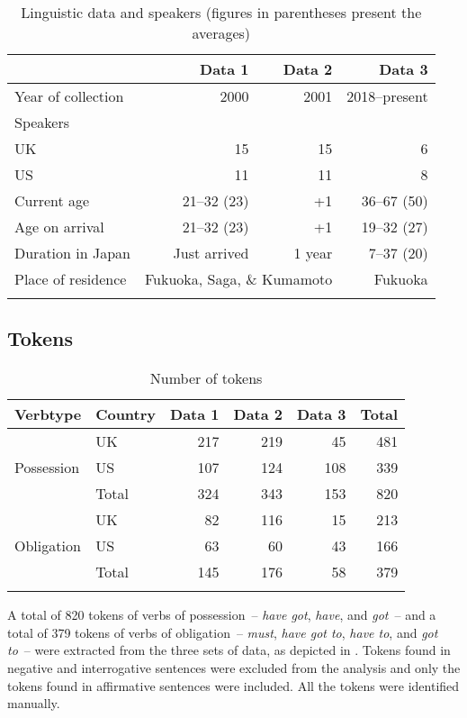 \documentclass[output=paper,colorlinks,citecolor=brown]{langscibook}
\begin{document}
\begin{table}
\begin{tabularx}{\textwidth}{Xrrr}
\lsptoprule
  & Data 1 & Data 2 & Data 3\\
\midrule
Year of collection & 2000 & 2001 & 2018--present\\
Speakers & & & \\
UK & 15 & 15 & 6\\
US & 11 & 11 & 8\\
Current age & 21--32 (23) & +1 & 36–67 (50)\\
Age on arrival & 21–32 (23) & +1 & 19–32 (27)\\
Duration in Japan & Just arrived & 1 year & 7–37 (20)\\
Place of residence & \multicolumn{2}{c}{Fukuoka, Saga, \& Kumamoto} & Fukuoka\\
\lspbottomrule
\end{tabularx}
\caption{\label{tab:hirano:1} Linguistic data and speakers (figures in parentheses present the averages)}
\end{table}



\subsection{Tokens} %
\label{sec:hirano:4.3}
\largerpage[2]

\begin{table}[b]
\begin{tabular}{llrrrr}
\lsptoprule
Verbtype & {Country} & {Data 1} & {Data 2} & {Data 3} & Total\\
\midrule
& UK &  217 &  219 &  45 &  481\\
Possession & US &  107 &  124 &  108 &  339\\
& Total &  324 &  343 &  153 &  820\\
\midrule
& UK &  82 &  116 &  15 &  213\\
Obligation & US &  63 &  60 &  43 &  166\\
 & Total &  145 &  176 &  58 &  379\\
\lspbottomrule
\end{tabular}
\caption{Number of tokens}
\label{tab:hirano:2}
\end{table}

A total of 820 tokens of verbs of possession~– \textit{have got}, \textit{have}, and \textit{got}~– and a total of 379 tokens of verbs of obligation~– \textit{must}, \textit{have got to}, \textit{have to}, and \textit{got to}~– were extracted from the three sets of data, as depicted in . Tokens found in negative and interrogative sentences were excluded from the analysis and only the tokens found in affirmative sentences were included. All the tokens were identified manually.
\end{document}

